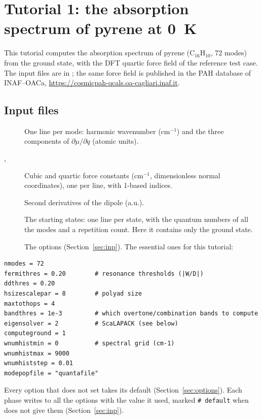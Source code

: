 \chapter{Tutorial 1: the absorption spectrum of pyrene at 0~K}\label{ch:tut-pyrene}

This tutorial computes the absorption spectrum of pyrene
(C$_{16}$H$_{10}$, 72 modes) from the ground state, with the DFT
quartic force field of the reference test case.
The input files are in ; the same force field is published in the PAH
database of INAF--OACa, \url{https://cosmicpah-qcals.oa-cagliari.inaf.it}.

\section{Input files}

\begin{description}
\item[] One line per mode: harmonic wavenumber (cm$^{-1}$)
  and the three components of $\partial\mu/\partial q$ (atomic units).
\item[, ] Cubic and quartic force constants
  (cm$^{-1}$, dimensionless normal coordinates), one per line, with 1-based
  indices.
\item[] Second derivatives of the dipole (a.u.).
\item[] The starting states: one line per state, with the
  quantum numbers of all the modes and a repetition count. Here it contains
  only the ground state.
\item[] The options (Section~\ref{sec:inp}). The essential ones for this tutorial:
\end{description}
\begin{lstlisting}
nmodes = 72
fermithres = 0.20        # resonance thresholds (|W/D|)
ddthres = 0.20
hsizescalepar = 8        # polyad size
maxtothops = 4
bandthres = 1e-3         # which overtone/combination bands to compute
eigensolver = 2          # ScaLAPACK (see below)
computeground = 1
wnumhistmin = 0          # spectral grid (cm-1)
wnumhistmax = 9000
wnumhiststep = 0.01
modepopfile = "quantafile"
\end{lstlisting}
Every option that  does not set takes its default
(Section~\ref{sec:options}). Each phase writes to  all the
options with the value it used, marked \texttt{\# default} when
 does not give them (Section~\ref{sec:inp}).

